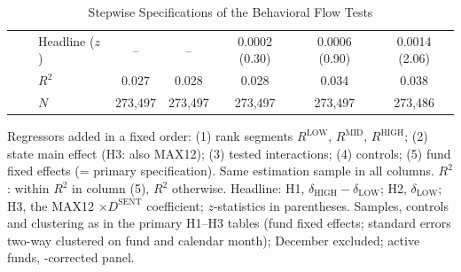 \begin{table}[!htbp]
{\begin{tabular}{lllccccc}
 & & Headline ($z$) & -- & -- & 0.0002 (0.30) & 0.0006 (0.90) & 0.0014 (2.06) \\
 & & $R^2$ & 0.027 & 0.028 & 0.028 & 0.034 & 0.038 \\
 & & $N$ & 273,497 & 273,497 & 273,497 & 273,497 & 273,486 \\
\bottomrule
\end{tabular}%
}\sbefit
\setlength{\tabletempwidth}{\wd\tabletempbox}
\ifdim\tabletempwidth>\linewidth\setlength{\tabletempwidth}{\linewidth}\fi
\begin{minipage}{\tabletempwidth}
\captionsetup{width=\linewidth}
\caption{Stepwise Specifications of the Behavioral Flow Tests}\label{tab:stepwise}
\ifdim\wd\tabletempbox>\linewidth
  \resizebox{\linewidth}{!}{\usebox{\tabletempbox}}
\else
  \usebox{\tabletempbox}
\fi
\par\medskip
\begin{singlespace}\tablefont\noindent
Regressors added in a fixed order: (1) rank segments $R^{\text{LOW}}$, $R^{\text{MID}}$, $R^{\text{HIGH}}$; (2) state main effect (H3: also MAX12); (3) tested interactions; (4) controls; (5) fund fixed effects (= primary specification). Same estimation sample in all columns. $R^2$: within $R^2$ in column (5), $R^2$ otherwise. Headline: H1, $\delta_{\text{HIGH}}-\delta_{\text{LOW}}$; H2, $\delta_{\text{LOW}}$; H3, the MAX12 $\times D^{\text{SENT}}$ coefficient; $z$-statistics in parentheses. Samples, controls and clustering as in the primary H1--H3 tables (fund fixed effects; standard errors two-way clustered on fund and calendar month); December excluded; active funds, \textcite{Evans2010}-corrected panel.
\end{singlespace}
\end{minipage}
\end{table}

